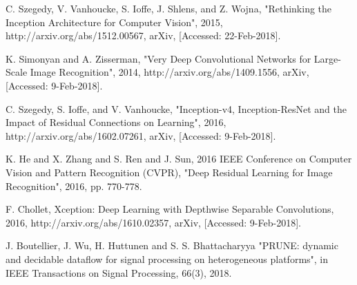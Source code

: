 \documentclass[conference]{IEEEtran}
\begin{document}
\begin{thebibliography}{00}
C. Szegedy, V. Vanhoucke, S. Ioffe, J. Shlens, and Z. Wojna, "Rethinking the Inception Architecture for Computer Vision", 2015, http://arxiv.org/abs/1512.00567, arXiv, [Accessed: 22-Feb-2018].

K. Simonyan and A. Zisserman, "Very Deep Convolutional Networks for Large-Scale Image Recognition", 2014, http://arxiv.org/abs/1409.1556, arXiv, [Accessed: 9-Feb-2018].

C. Szegedy, S. Ioffe, and V. Vanhoucke, "Inception-v4, Inception-ResNet and the Impact of Residual Connections on Learning", 2016, http://arxiv.org/abs/1602.07261, arXiv, [Accessed: 9-Feb-2018].

K. He and X. Zhang and S. Ren and J. Sun, 2016 IEEE Conference on Computer Vision and Pattern Recognition (CVPR), "Deep Residual Learning for Image Recognition", 2016, pp. 770-778.

F. Chollet, Xception: Deep Learning with Depthwise Separable Convolutions, 2016, http://arxiv.org/abs/1610.02357, arXiv, [Accessed: 9-Feb-2018].

 J. Boutellier, J. Wu, H. Huttunen and S. S. Bhattacharyya "PRUNE: dynamic and decidable dataflow for signal processing on heterogeneous platforms", in IEEE Transactions on Signal Processing, 66(3), 2018.


\iffalse

\bibitem{tensorflow}M. Abadi, A. Agarwal, P. Barham et.al, "TensorFlow: Large-Scale Machine Learning on Heterogeneous Distributed Systems", 2016, http://arxiv.org/abs/1603.04467, arXiv, Wed, 07 Jun 2017 14:40:20 +0200.

\bibitem{Koll2007}K. Kollreider and H. Fronthaler and M. I. Faraj and J. Bigun, IEEE Transactions on Information Forensics and Security, "Real-Time Face Detection and Motion Analysis With Application in "Liveness" Assessment", 2007, Vol. 2, No. 3, pp. 548-558

\bibitem{shi2012}K. Shi and S. Pang and F. Yu, 2012 2nd International Conference on Consumer Electronics, Communications and Networks, "A real-time face detection and recognition system", 2012, pp. 3074-3077

\bibitem{shak2002} G. Shakhnarovich and P. A. Viola and B. Moghaddam, Proceedings of Fifth IEEE International Conference on Automatic Face Gesture Recognition, "A unified learning framework for real time face detection and classification", 2002, pp. 14-21


\fi

\end{thebibliography}
\end{document}
